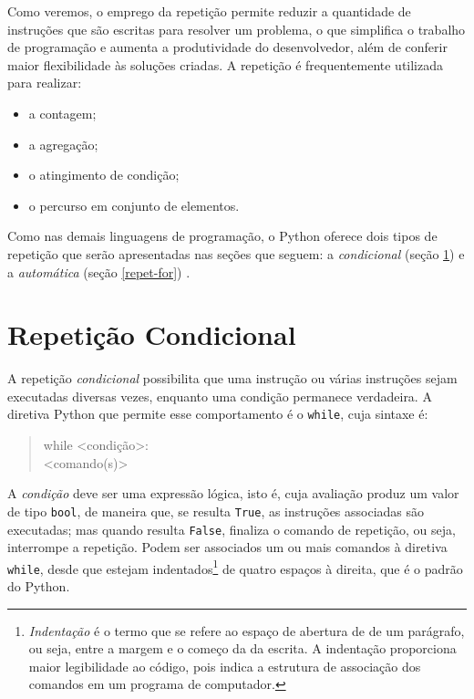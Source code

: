 \documentclass[
]{book}
\providecommand{\tightlist}{%
  \setlength{\itemsep}{0pt}\setlength{\parskip}{0pt}}
\begin{document}
Como veremos, o emprego da repetição permite reduzir a quantidade de instruções que são escritas para resolver um problema, o que simplifica o trabalho de programação e aumenta a produtividade do desenvolvedor, além de conferir maior flexibilidade às soluções criadas. A repetição é frequentemente utilizada para realizar:

\begin{itemize}
\tightlist
\item
  a contagem;
\item
  a agregação;
\item
  o atingimento de condição;
\item
  o percurso em conjunto de elementos.
\end{itemize}

Como nas demais linguagens de programação, o Python oferece dois tipos de repetição que serão apresentadas nas seções que seguem: a \emph{condicional} (seção \ref{repet-while}) e a \emph{automática} (seção \ref{repet-for}) .

\hypertarget{repet-while}{%
\section{Repetição Condicional}\label{repet-while}}

A repetição \emph{condicional} possibilita que uma instrução ou várias instruções sejam executadas diversas vezes, enquanto uma condição permanece verdadeira. A diretiva Python que permite esse comportamento é o \texttt{while}, cuja sintaxe é:

\begin{quote}
while \textless condição\textgreater:\\
\hspace*{0.333em}\hspace*{0.333em}\hspace*{0.333em}\hspace*{0.333em}\hspace*{0.333em}\textless comando(s)\textgreater{}
\end{quote}

A \emph{condição} deve ser uma expressão lógica, isto é, cuja avaliação produz um valor de tipo \texttt{bool}, de maneira que, se resulta \texttt{True}, as instruções associadas são executadas; mas quando resulta \texttt{False}, finaliza o comando de repetição, ou seja, interrompe a repetição. Podem ser associados um ou mais comandos à diretiva \texttt{while}, desde que estejam indentados\footnote{\emph{Indentação} é o termo que se refere ao espaço de abertura de de um parágrafo, ou seja, entre a margem e o começo da da escrita. A indentação proporciona maior legibilidade ao código, pois indica a estrutura de associação dos comandos em um programa de computador.} de quatro espaços à direita, que é o padrão do Python.
\end{document}
